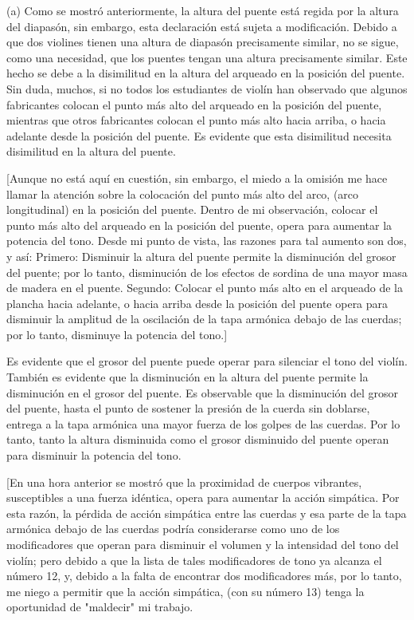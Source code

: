 \documentclass[12pt]{book}
\begin{document}
(a) Como se mostró anteriormente, la altura del puente está regida por la altura del diapasón, sin embargo, esta declaración está sujeta a modificación. Debido a que dos violines tienen una altura de diapasón precisamente similar, no se sigue, como una necesidad, que los puentes tengan una altura precisamente similar. Este hecho se debe a la disimilitud en la altura del arqueado en la posición del puente. Sin duda, muchos, si no todos los estudiantes de violín han observado que algunos fabricantes colocan el punto más alto del arqueado en la posición del puente, mientras que otros fabricantes colocan el punto más alto hacia arriba, o hacia adelante desde la posición del puente. Es evidente que esta disimilitud necesita disimilitud en la altura del puente.

[Aunque no está aquí en cuestión, sin embargo, el miedo a la omisión me hace llamar la atención sobre la colocación del punto más alto del arco, (arco longitudinal) en la posición del puente. Dentro de mi observación, colocar el punto más alto del arqueado en la posición del puente, opera para aumentar la potencia del tono. Desde mi punto de vista, las razones para tal aumento son dos, y así: Primero: Disminuir la altura del puente permite la disminución del grosor del puente; por lo tanto, disminución de los efectos de sordina de una mayor masa de madera en el puente. Segundo: Colocar el punto más alto en el arqueado de la plancha hacia adelante, o hacia arriba desde la posición del puente opera para disminuir la amplitud de la oscilación de la tapa armónica debajo de las cuerdas; por lo tanto, disminuye la potencia del tono.]

Es evidente que el grosor del puente puede operar para silenciar el tono del violín. También es evidente que la disminución en la altura del puente permite la disminución en el grosor del puente. Es observable que la disminución del grosor del puente, hasta el punto de sostener la presión de la cuerda sin doblarse, entrega a la tapa armónica una mayor fuerza de los golpes de las cuerdas. Por lo tanto, tanto la altura disminuida como el grosor disminuido del puente operan para disminuir la potencia del tono.

[En una hora anterior se mostró que la proximidad de cuerpos vibrantes, susceptibles a una fuerza idéntica, opera para aumentar la acción simpática. Por esta razón, la pérdida de acción simpática entre las cuerdas y esa parte de la tapa armónica debajo de las cuerdas podría considerarse como uno de los modificadores que operan para disminuir el volumen y la intensidad del tono del violín; pero debido a que la lista de tales modificadores de tono ya alcanza el número 12, y, debido a la falta de encontrar dos modificadores más, por lo tanto, me niego a permitir que la acción simpática, (con su número 13) tenga la oportunidad de "maldecir" mi trabajo.
\end{document}
